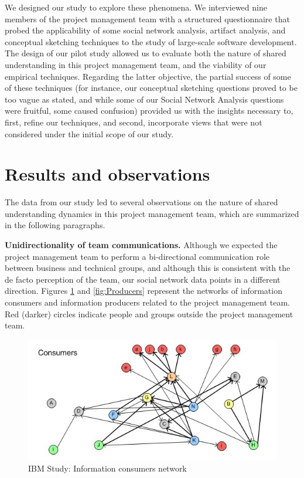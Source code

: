 We designed our study to explore these phenomena. We interviewed nine members of the project management team with a structured questionnaire that probed the applicability of some social network analysis, artifact analysis, and conceptual sketching techniques to the study of large-scale software development. The design of our pilot study allowed us to evaluate both the nature of shared understanding in this project management team, and the viability of our empirical techniques. Regarding the latter objective, the partial success of some of these techniques (for instance, our conceptual sketching questions proved to be too vague as stated, and while some of our Social Network Analysis questions were fruitful, some caused confusion) provided us with the insights necessary to, first, refine our techniques, and second, incorporate views that were not considered under the initial scope of our study.


\section{Results and observations}

The data from our study led to several observations on the nature of shared understanding dynamics in this project management team, which are summarized in the following paragraphs.

\textbf{Unidirectionality of team communications.} Although we expected the project management team to perform a bi-directional communication role between business and technical groups, and although this is consistent with the de facto perception of the team, our social network data points in a different direction. Figures \ref{fig:Consumers} and \ref{fig:Producers} represent the networks of information consumers and information producers related to the project management team. Red (darker) circles indicate people and groups outside the project management team.

\begin{figure}[tbp]
\centering
\includegraphics[scale=0.8]{consumers}
\caption{\label{fig:Consumers}IBM Study: Information consumers network}
\end{figure}

